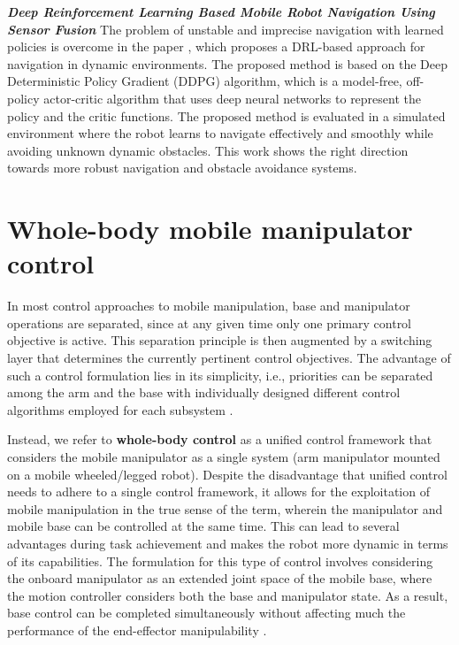 \textbf{\textit{Deep Reinforcement Learning Based Mobile Robot Navigation Using Sensor Fusion}} \quad
The problem of unstable and imprecise navigation with learned policies is overcome in the
paper \cite{yan2023drlnavigation}, which proposes a DRL-based approach for navigation in dynamic
environments. The proposed method is based on the Deep Deterministic Policy Gradient (DDPG)
algorithm, which is a model-free, off-policy actor-critic algorithm that uses deep neural networks
to represent the policy and the critic functions. The proposed method is evaluated in a
simulated environment where the robot learns to navigate effectively and smoothly while avoiding
unknown dynamic obstacles. This work shows the right direction towards more robust
navigation and obstacle avoidance systems.

\section{Whole-body mobile manipulator control}

In most control approaches to mobile manipulation, base and manipulator operations are
separated, since at any given time only one primary control objective is
active. This separation principle is then augmented by a switching layer that determines the
currently pertinent control objectives. The advantage of such a control formulation lies in its
simplicity, i.e., priorities can be separated among the arm and the base with individually
designed different control algorithms employed for each subsystem \cite{thakar2023survey}.

Instead, we refer to \textbf{whole-body control} as a unified control framework that considers
the mobile manipulator as a single system (arm manipulator mounted on a mobile wheeled/legged robot).
Despite the disadvantage that unified control needs to adhere to a single control framework,
it allows for the exploitation of mobile manipulation in the true sense of the term,
wherein the manipulator and mobile base can be controlled at the same time. This can lead
to several advantages during task achievement and makes the robot more dynamic in terms
of its capabilities. The formulation for this type of control involves considering
the onboard manipulator as an extended joint space of the mobile base, where the motion controller
considers both the base and manipulator state. As a result, base control can be completed
simultaneously without affecting much the performance of the end-effector manipulability
\cite{thakar2023survey}.

